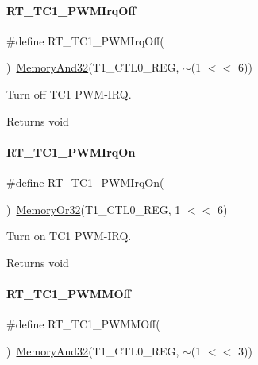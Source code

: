 \paragraph{\texorpdfstring{R\+T\+\_\+\+T\+C1\+\_\+\+P\+W\+M\+Irq\+Off}{RT\_TC1\_PWMIrqOff}}
{\footnotesize\ttfamily \#define R\+T\+\_\+\+T\+C1\+\_\+\+P\+W\+M\+Irq\+Off(\begin{DoxyParamCaption}{ }\end{DoxyParamCaption})~\mbox{\hyperlink{a00020_a5c1a2bd4c1bd4c2f429d8042a45327ff}{Memory\+And32}}(T1\+\_\+\+C\+T\+L0\+\_\+\+R\+EG, $\sim$(1 $<$$<$ 6))}



Turn off T\+C1 P\+W\+M-\/\+I\+RQ. 

\begin{DoxyReturn}{Returns}
void 
\end{DoxyReturn}
\mbox{\label{a00044_a61477182241a8629176801cca44ce09a}} 
\paragraph{\texorpdfstring{R\+T\+\_\+\+T\+C1\+\_\+\+P\+W\+M\+Irq\+On}{RT\_TC1\_PWMIrqOn}}
{\footnotesize\ttfamily \#define R\+T\+\_\+\+T\+C1\+\_\+\+P\+W\+M\+Irq\+On(\begin{DoxyParamCaption}{ }\end{DoxyParamCaption})~\mbox{\hyperlink{a00020_a9ea92ebccdef6bdaca4d00210cc7266d}{Memory\+Or32}}(T1\+\_\+\+C\+T\+L0\+\_\+\+R\+EG, 1 $<$$<$ 6)}



Turn on T\+C1 P\+W\+M-\/\+I\+RQ. 

\begin{DoxyReturn}{Returns}
void 
\end{DoxyReturn}
\mbox{\label{a00044_aa070a043272a38ae84492146683a00d3}} 
\paragraph{\texorpdfstring{R\+T\+\_\+\+T\+C1\+\_\+\+P\+W\+M\+M\+Off}{RT\_TC1\_PWMMOff}}
{\footnotesize\ttfamily \#define R\+T\+\_\+\+T\+C1\+\_\+\+P\+W\+M\+M\+Off(\begin{DoxyParamCaption}{ }\end{DoxyParamCaption})~\mbox{\hyperlink{a00020_a5c1a2bd4c1bd4c2f429d8042a45327ff}{Memory\+And32}}(T1\+\_\+\+C\+T\+L0\+\_\+\+R\+EG, $\sim$(1 $<$$<$ 3))}



